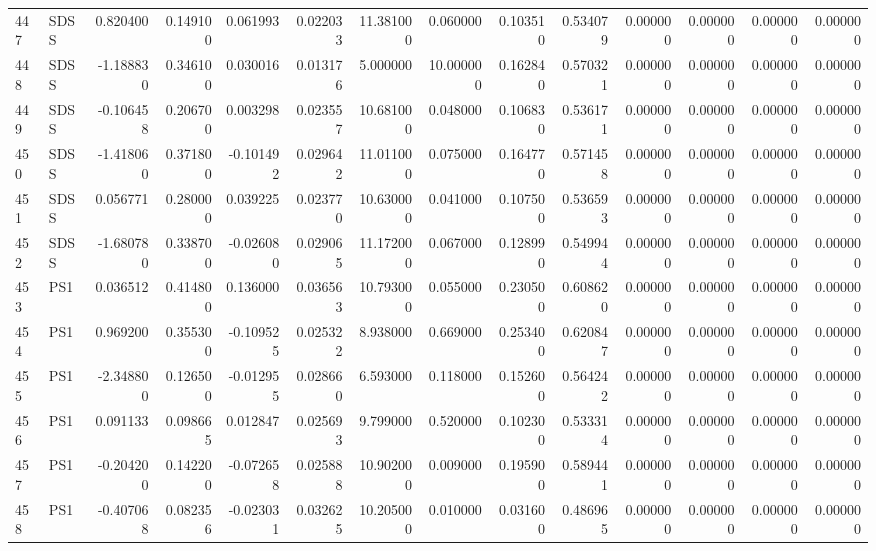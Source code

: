 \begin{tabular}{llrrrrrrrrrrrr}
447 &   SDSS &  0.820400 &      0.149100 &  0.061993 &    0.022033 &  11.381000 &      0.060000 &   0.103510 &  0.534079 &  0.000000 &   0.000000 &     0.000000 &     0.000000 \\
448 &   SDSS & -1.188830 &      0.346100 &  0.030016 &    0.013176 &   5.000000 &     10.000000 &   0.162840 &  0.570321 &  0.000000 &   0.000000 &     0.000000 &     0.000000 \\
449 &   SDSS & -0.106458 &      0.206700 &  0.003298 &    0.023557 &  10.681000 &      0.048000 &   0.106830 &  0.536171 &  0.000000 &   0.000000 &     0.000000 &     0.000000 \\
450 &   SDSS & -1.418060 &      0.371800 & -0.101492 &    0.029642 &  11.011000 &      0.075000 &   0.164770 &  0.571458 &  0.000000 &   0.000000 &     0.000000 &     0.000000 \\
451 &   SDSS &  0.056771 &      0.280000 &  0.039225 &    0.023770 &  10.630000 &      0.041000 &   0.107500 &  0.536593 &  0.000000 &   0.000000 &     0.000000 &     0.000000 \\
452 &   SDSS & -1.680780 &      0.338700 & -0.026080 &    0.029065 &  11.172000 &      0.067000 &   0.128990 &  0.549944 &  0.000000 &   0.000000 &     0.000000 &     0.000000 \\
453 &    PS1 &  0.036512 &      0.414800 &  0.136000 &    0.036563 &  10.793000 &      0.055000 &   0.230500 &  0.608620 &  0.000000 &   0.000000 &     0.000000 &     0.000000 \\
454 &    PS1 &  0.969200 &      0.355300 & -0.109525 &    0.025322 &   8.938000 &      0.669000 &   0.253400 &  0.620847 &  0.000000 &   0.000000 &     0.000000 &     0.000000 \\
455 &    PS1 & -2.348800 &      0.126500 & -0.012955 &    0.028660 &   6.593000 &      0.118000 &   0.152600 &  0.564242 &  0.000000 &   0.000000 &     0.000000 &     0.000000 \\
456 &    PS1 &  0.091133 &      0.098665 &  0.012847 &    0.025693 &   9.799000 &      0.520000 &   0.102300 &  0.533314 &  0.000000 &   0.000000 &     0.000000 &     0.000000 \\
457 &    PS1 & -0.204200 &      0.142200 & -0.072658 &    0.025888 &  10.902000 &      0.009000 &   0.195900 &  0.589441 &  0.000000 &   0.000000 &     0.000000 &     0.000000 \\
458 &    PS1 & -0.407068 &      0.082356 & -0.023031 &    0.032625 &  10.205000 &      0.010000 &   0.031600 &  0.486965 &  0.000000 &   0.000000 &     0.000000 &     0.000000 \\

\end{tabular}
